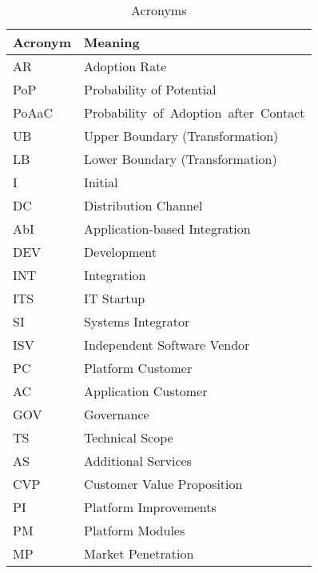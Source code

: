 \begin{table}[tbh]
	\centering
	\begin{tabular}{ll}
			\toprule 
			Acronym & Meaning \\ \midrule
			AR & Adoption Rate \\ 
			PoP & Probability of Potential \\ 
			PoAaC & Probability~of~Adoption~after~Contact \\ 
			UB & Upper Boundary (Transformation) \\
			LB & Lower Boundary (Transformation) \\
			I & Initial\\ \midrule
			DC & Distribution Channel \\
			AbI & Application-based Integration \\
			DEV & Development \\
			INT & Integration \\ \midrule
			ITS & IT Startup \\
			SI & Systems Integrator \\
			ISV & Independent Software Vendor \\
			PC & Platform Customer \\
			AC & Application Customer \\ \midrule
			GOV & Governance \\
			TS & Technical Scope \\
			AS & Additional Services \\
			CVP & Customer Value Proposition \\ \midrule
			PI & Platform Improvements \\
			PM & Platform Modules\\
			MP & Market Penetration \\ \bottomrule
	\end{tabular}
	\caption{Acronyms}
	\label{tab:acro}
\end{table}

\clearpage

\newpage
